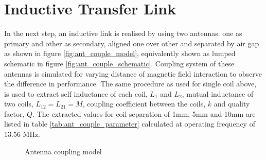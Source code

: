 \documentclass[UKenglish]{ifimaster}  %
\begin{document}
\section{Inductive Transfer Link}		%

In the next step, an inductive link is realised by using two antennas: one as primary and other as secondary, aligned one over 
other and separated by air gap as shown in figure  \ref{fig:ant_couple_model}, equivalently shown as lumped schematic in 
figure  \ref{fig:ant_couple_schematic}. Coupling system of these antennas is simulated for 
varying distance of magnetic field interaction to observe the difference in performance. The same procedure as 
used for single coil above, is used to extract self inductance of each coil, $L_{1}$ and $L_{2}$, mutual inductance 
of two coils, $ L_{12} = L_{21} = M $, coupling coefficient between the coils, $k$ and quality factor, $Q$. The extracted values for coil separation of 
1mm, 5mm and 10mm are listed in table \ref{tab:ant_couple_parameter} calculated at operating frequency of 13.56 MHz. \\

\begin{figure} [htbp]
  \centering 
\hfill
 \caption{Antenna coupling model} 
\label{fig:ant_couple} 
\end{figure}
\end{document}
